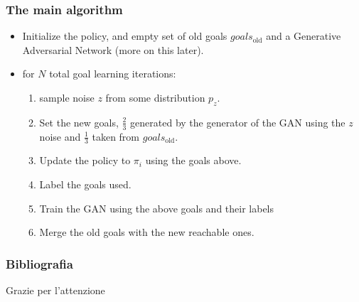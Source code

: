 \documentclass{beamer}
\theoremstyle{plain}
\theoremstyle{definition}
\theoremstyle{remark}
\begin{document}
\begin{frame}
	\frametitle{The main algorithm}
	\begin{itemize}
		\item Initialize the policy, and empty set of old goals $goals_{\text{old}}$ and a Generative Adversarial Network (more on this later).
		\item for $N$ total goal learning iterations:
		\begin{enumerate}
			\item sample noise $z$ from some distribution $p_z$.
			\item Set the new goals, $\frac{2}{3}$ generated by the generator of the GAN using the $z$ noise and $\frac{1}{3}$ taken from $goals_{\text{old}}$.
			\item Update the policy to $\pi_i$ using the goals above.
			\item Label the goals used.
			\item Train the GAN using the above goals and their labels
			\item Merge the old goals with the new reachable ones.
		\end{enumerate}
	\end{itemize}	
\end{frame}

\nocite{AGG}

\begin{frame}[allowframebreaks]
	\frametitle{Bibliografia}
	
	
\end{frame}

\begin{frame}
	\Huge{\centerline{Grazie per l'attenzione}}
\end{frame}

\end{document}
